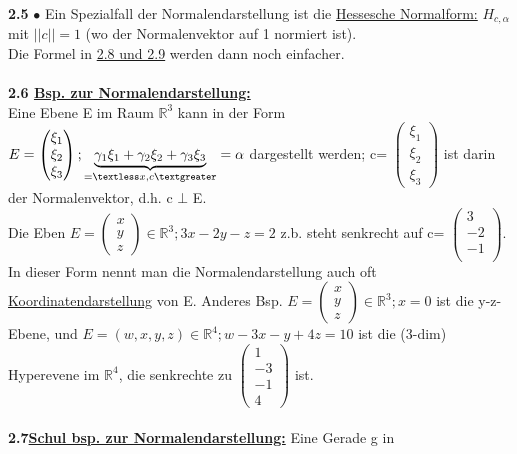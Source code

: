 \documentclass[]{scrartcl}
\begin{document}
{\textbf{2.5} $\bullet$ Ein Spezialfall der Normalendarstellung ist die 
\ul{Hessesche Normalform:} $H_{c,\alpha}$ mit \ul{$||c|| = 1$} (wo der 
Normalenvektor auf 1 normiert ist).\\
 Die Formel in  \ul{2.8 und 2.9} werden dann noch einfacher.\\\\
\textbf{ 2.6 \underline{Bsp. zur Normalendarstellung:}}\\ Eine Ebene E im Raum 
$\mathbb{R}^3$ kann in der Form $E = {\begin{pmatrix} 
 		\xi_1\\
 		\xi_2\\
 		\xi_3
 \end{pmatrix}; \underbrace{\gamma_1\xi_1+\gamma_2\xi_2+\gamma_3\xi_3}_{=\textless x,c \textgreater}= \alpha}$ dargestellt werden; c= 
$\begin{pmatrix} 
	\xi_1\\
	\xi_2\\
	\xi_3
\end{pmatrix}$ ist darin der Normalenvektor, d.h. c $\bot$ E.\\
Die Eben $E = {\begin{pmatrix} 
		x\\
		y\\
		z
\end{pmatrix}\in \mathbb{R}^3; 3x-2y-z=2}$ z.b. steht senkrecht auf c= $\begin{pmatrix} 
3\\
-2\\
-1\\
\end{pmatrix}$.\\
In dieser Form nennt man die Normalendarstellung auch oft \ul{Koordinatendarstellung} von E. Anderes Bsp.  $E = {\begin{pmatrix} 
		x\\
		y\\
		z
	\end{pmatrix}\in \mathbb{R}^3; x=0}$ ist die y-z-Ebene, und  $E = {(w,x,y,z)\in \mathbb{R}^4; w-3x-y+4z=10}$ ist die (3-dim) Hyperevene im $\mathbb{R}^4$, die senkrechte zu $\begin{pmatrix}
	1\\
	-3\\
	-1\\
	4
\end{pmatrix}$ ist.\\
\\
\textbf{2.7\underline{Schul bsp. zur Normalendarstellung:}} Eine Gerade g in 
}
\end{document}
